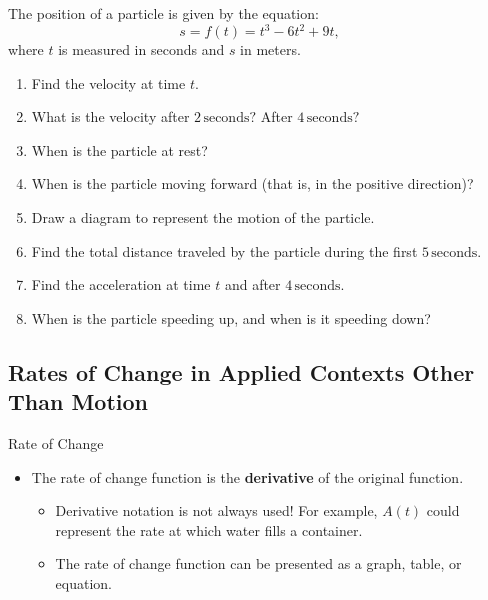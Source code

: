 \documentclass[12pt]{article}
\theoremstyle{beautifulthm}
\begin{document}
\begin{tcolorbox}[colback=examplebg, colframe=red!75!black, title=\textbf{EXAMPLE 2:  Position of a particle}, fonttitle=\bfseries, sharp corners]
The position of a particle is given by the equation:
\[
s = f(t) = t^3 - 6t^2 + 9t,
\]
where \( t \) is measured in seconds and \( s \) in meters.
\begin{enumerate}
    \item[(a)] Find the velocity at time \( t \).
    \item[(b)] What is the velocity after \( 2 \, \text{seconds}? \) After \( 4 \, \text{seconds}? \)
    \item[(c)] When is the particle at rest?
    \item[(d)] When is the particle moving forward (that is, in the positive direction)?
    \item[(e)] Draw a diagram to represent the motion of the particle.
    \item[(f)] Find the total distance traveled by the particle during the first \( 5 \, \text{seconds.} \)
    \item[(g)] Find the acceleration at time \( t \) and after \( 4 \, \text{seconds.} \)
    \item[(h)] When is the particle speeding up, and when is it speeding down?
\end{enumerate}




\end{tcolorbox}




\newpage
\subsection{Rates of Change in Applied Contexts Other Than Motion}


\begin{Definition}{Rate of Change}{}

\begin{itemize}

    \item The rate of change function is the \textbf{derivative} of the original function.
    \begin{itemize}
        \item Derivative notation is not always used! For example, \( A(t) \) could represent the rate at which water fills a container.
        \item The rate of change function can be presented as a graph, table, or equation.
    \end{itemize}
\end{itemize}
\end{Definition}
\end{document}
